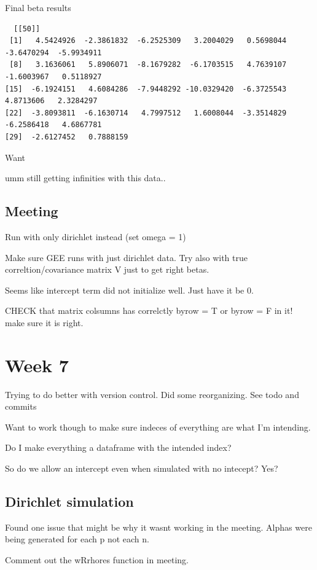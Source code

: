 \documentclass[10pt]{article}
\theoremstyle{definition}
\begin{document}
Final beta results
\begin{verbatim}
  [[50]]
 [1]   4.5424926  -2.3861832  -6.2525309   3.2004029   0.5698044  -3.6470294  -5.9934911
 [8]   3.1636061   5.8906071  -8.1679282  -6.1703515   4.7639107  -1.6003967   0.5118927
[15]  -6.1924151   4.6084286  -7.9448292 -10.0329420  -6.3725543   4.8713606   2.3284297
[22]  -3.8093811  -6.1630714   4.7997512   1.6008044  -3.3514829  -6.2586418   4.6867781
[29]  -2.6127452   0.7888159
\end{verbatim}

Want


umm still getting infinities with this data..



\subsection{Meeting}
Run with only dirichlet instead (set omega = 1)

Make sure GEE runs with just dirichlet data.
Try also with true correltion/covariance matrix V just to get right betas.

Seems like intercept term did not initialize well. Just have it be 0.

CHECK that matrix colsumns has correlctly byrow = T or byrow = F in it! make sure it is right.


\newpage

\section{Week 7}

Trying to do better with version control. Did some reorganizing. See todo and commits

Want to work though to make sure indeces of everything are what I'm intending.

Do I make everything a dataframe with the intended index?

So do we allow an intercept even when simulated with no intecept? Yes?



\subsection{Dirichlet simulation}
Found one issue that might be why it wasnt working in the meeting. Alphas were being generated for each p not each n.

Comment out the wRrhores function in meeting.
\end{document}

